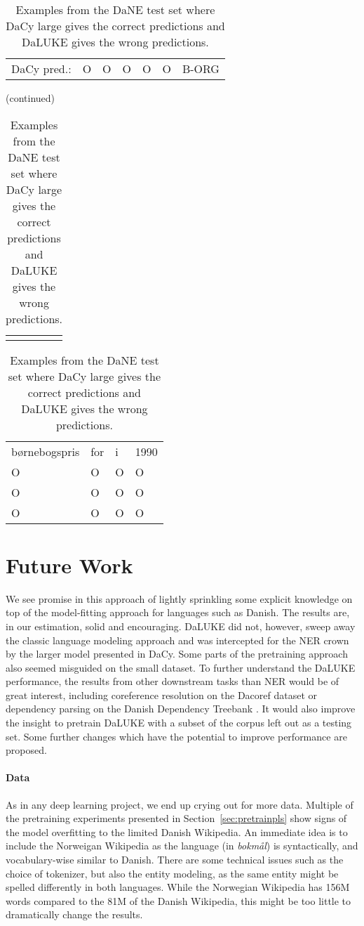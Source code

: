 \documentclass[main.tex]{subfiles}
\begin{document}
\begin{table}[H]
\begin{tabular}{l|llllll}
        DaCy pred.:   & O    & O       & O    & O  & O       & B-ORG
    \end{tabular}
    (continued)\\
    \begin{tabular}{c} %
        \quad \quad \quad \quad \quad \quad \quad \quad \quad \quad \quad
    \end{tabular}
    \begin{tabular}{llll}
        børnebogspris  & for  & i  & 1990  \\
        O              & O    & O  & O     \\\hline
        O              & O    & O  & O     \\
        O              & O    & O  & O
    \end{tabular}
    \caption{
        Examples from the DaNE test set where DaCy large gives the correct predictions and DaLUKE gives the wrong predictions.
    }
    \label{tab:dacyex}
\end{table}\noindent

\section{Future Work}
We see promise in this approach of lightly sprinkling some explicit knowledge on top of the model-fitting approach for languages such as Danish.
The results are, in our estimation, solid and encouraging.
DaLUKE did not, however, sweep away the classic language modeling approach and was intercepted for the NER crown by the larger model presented in DaCy.
Some parts of the pretraining approach also seemed misguided on the small dataset.
To further understand the DaLUKE performance, the results from other downstream tasks than NER would be of great interest, including coreference resolution on the Dacoref dataset \cite{kromann2004cdt, danlp2021} or dependency parsing on the Danish Dependency Treebank \cite{kromann2003ddt}.
It would also improve the insight to pretrain DaLUKE with a subset of the corpus left out as a testing set.
Some further changes which have the potential to improve performance are proposed.

\paragraph{Data}
As in any deep learning project, we end up crying out for more data.
Multiple of the pretraining experiments presented in Section~\ref{sec:pretrainpls} show signs of the model overfitting to the limited Danish Wikipedia.
An immediate idea is to include the Norweigan Wikipedia as the language (in \emph{bokmål}) is syntactically, and vocabulary-wise similar to Danish.
There are some technical issues such as the choice of tokenizer, but also the entity modeling, as the same entity might be spelled differently in both languages.
While the Norwegian Wikipedia has 156M words \footnotemark compared to the 81M of the Danish Wikipedia, this might be too little to dramatically change the results.
\end{document}
